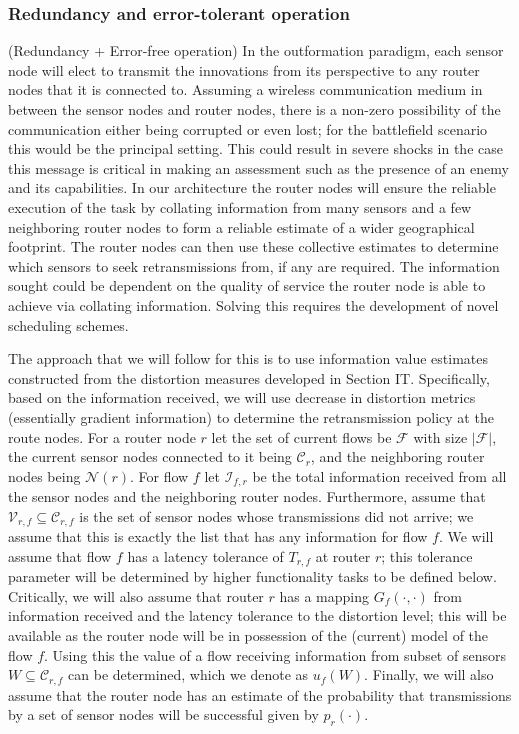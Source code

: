 \documentclass[12pt,letterpaper]{article}
\begin{document}
\subsubsection{Redundancy and error-tolerant operation}\label{subsec:redundancy}

(Redundancy + Error-free operation) In the outformation paradigm, each sensor node will elect to transmit the innovations from its perspective to any router nodes that it is connected to. Assuming a wireless communication medium in between the sensor nodes and router nodes, there is a non-zero possibility of the communication either being corrupted or even lost; for the battlefield scenario this would be the principal setting.  This could result in severe shocks in the case this message is critical in making an assessment such as the presence of an enemy and its capabilities. In our architecture the router nodes will ensure the reliable execution of the task by collating information from many sensors and a few neighboring router nodes to form a reliable estimate of a wider geographical footprint. The router nodes can then use these collective estimates to determine which sensors to seek retransmissions from, if any are required. The information sought could be dependent on the quality of service the router node is able to achieve via collating information. Solving this requires the development of novel scheduling schemes. 

The approach that we will follow for this is to use information value estimates constructed from the distortion measures developed in Section IT. Specifically, based on the information received, we will use decrease in distortion metrics (essentially gradient information) to determine the retransmission policy at the route nodes. For a router node $r$ let the set of current flows be $\mathcal{F}$ with size $|\mathcal{F}|$, the current sensor nodes connected to it being $\mathcal{C}_r$, and the neighboring router nodes being $\mathcal{N}(r)$. For flow $f$ let $\mathcal{I}_{f,r}$ be the total information received from all the sensor nodes and the neighboring router nodes. Furthermore, assume that $\mathcal{V}_{r,f} \subseteq \mathcal{C}_{r,f}$ is the set of sensor nodes whose transmissions did not arrive; we assume that this is exactly the list that has any information for flow $f$. We will assume that flow $f$ has a latency tolerance of $T_{r,f}$ at router $r$; this tolerance parameter will be determined by higher functionality tasks to be defined below. Critically, we will also assume that router $r$ has a mapping $G_f(\cdot,\cdot)$ from information received and the latency tolerance to the distortion level; this will be available as the router node will be in possession of the (current) model of the flow $f$. Using this the value of a flow receiving information from subset of sensors $W\subseteq \mathcal{C}_{r,f}$ can be determined, which we denote as $u_f(W)$. Finally, we will also assume that the router node has an estimate of the probability that transmissions by a set of sensor nodes will be successful given by $p_r(\cdot)$.
\end{document}
